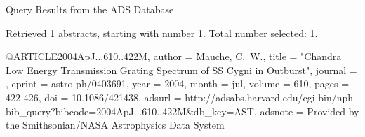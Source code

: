 Query Results from the ADS Database


Retrieved 1 abstracts, starting with number 1.  Total number selected: 1.

@ARTICLE{2004ApJ...610..422M,
   author = {{Mauche}, C.~W.},
    title = "{Chandra Low Energy Transmission Grating Spectrum of SS Cygni in Outburst}",
  journal = {\apj},
   eprint = {astro-ph/0403691},
     year = 2004,
    month = jul,
   volume = 610,
    pages = {422-426},
      doi = {10.1086/421438},
   adsurl = {http://adsabs.harvard.edu/cgi-bin/nph-bib_query?bibcode=2004ApJ...610..422M&db_key=AST},
  adsnote = {Provided by the Smithsonian/NASA Astrophysics Data System}
}


